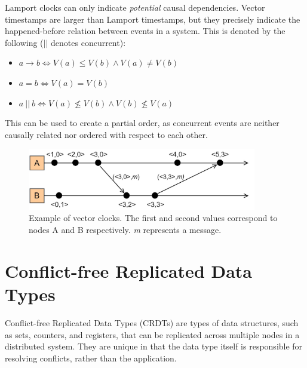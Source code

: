 \documentclass[12pt]{report}
\begin{document}
Lamport clocks can only indicate \emph{potential} causal dependencies. Vector timestamps are larger than Lamport timestamps, but they precisely indicate the happened-before relation between events in a system. This is denoted by the following ($\vert \vert$ denotes concurrent):

\begin{itemize}
    \item $a \rightarrow b \iff V(a) \leq V(b) \land V(a) \not = V(b)$
    \item $a = b \iff V(a) = V(b)$
    \item $a \: || \:  b \iff V(a) \not \leq V(b) \land V(b) \not \leq V(a)$
\end{itemize}

This can be used to create a partial order, as concurrent events are neither causally related nor ordered with respect to each other.

\begin{figure}
    \centering
    \includegraphics[width=10cm]{VectorClocks.jpg}
    \caption{Example of vector clocks. The first and second values correspond to nodes A and B respectively. \textit{m} represents a message.}
    \label{fig:vector}
\end{figure}

\section{Conflict-free Replicated Data Types}
Conflict-free Replicated Data Types (CRDTs) are types of data structures, such as sets, counters, and registers, that can be replicated across multiple nodes in a distributed system. They are unique in that the data type itself is responsible for resolving conflicts, rather than the application. 
\end{document}
